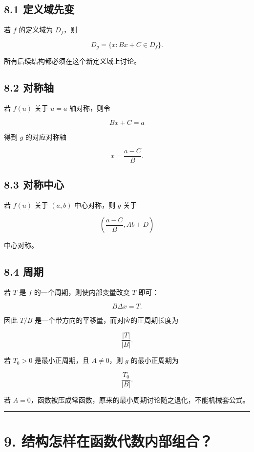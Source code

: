 \documentclass[11pt,a4paper]{ctexart}
\begin{document}
\subsection{8.1 定义域先变}\label{ux5b9aux4e49ux57dfux5148ux53d8}

若 \(f\) 的定义域为 \(D_f\)，则

\[
\boxed{D_g=\{x:Bx+C\in D_f\}}.
\]

所有后续结构都必须在这个新定义域上讨论。

\subsection{8.2 对称轴}\label{ux5bf9ux79f0ux8f74}

若 \(f(u)\) 关于 \(u=a\) 轴对称，则令

\[
Bx+C=a
\]

得到 \(g\) 的对应对称轴

\[
\boxed{x=\frac{a-C}{B}}.
\]

\subsection{8.3 对称中心}\label{ux5bf9ux79f0ux4e2dux5fc3}

若 \(f(u)\) 关于 \((a,b)\) 中心对称，则 \(g\) 关于

\[
\boxed{\left(\frac{a-C}{B},Ab+D\right)}
\]

中心对称。

\subsection{8.4 周期}\label{ux5468ux671f-1}

若 \(T\) 是 \(f\) 的一个周期，则使内部变量改变 \(T\) 即可：

\[
B\Delta x=T.
\]

因此 \(T/B\) 是一个带方向的平移量，而对应的正周期长度为

\[
\boxed{\frac{|T|}{|B|}}.
\]

若 \(T_0>0\) 是最小正周期，且 \(A\ne0\)，则 \(g\) 的最小正周期为

\[
\boxed{\frac{T_0}{|B|}}.
\]

若
\(A=0\)，函数被压成常函数，原来的最小周期讨论随之退化，不能机械套公式。

\begin{center}\rule{0.5\linewidth}{0.5pt}\end{center}

\section{9.
结构怎样在函数代数内部组合？}\label{ux7ed3ux6784ux600eux6837ux5728ux51fdux6570ux4ee3ux6570ux5185ux90e8ux7ec4ux5408}
\end{document}
